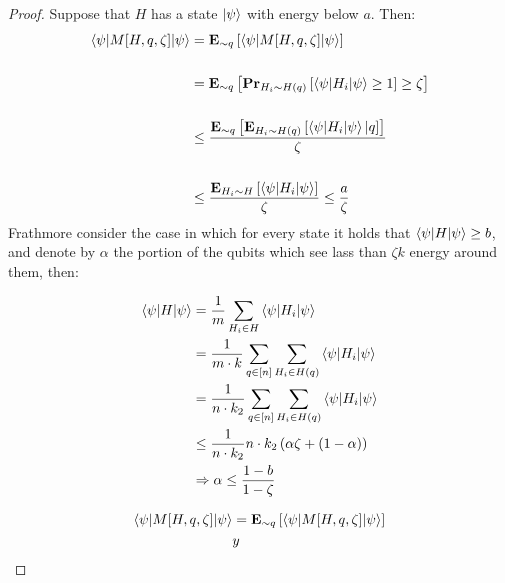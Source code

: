 \documentclass[manuscript,screen,review]{acmart}
\begin{document}
\begin{proof}
  Suppose that $H$ has a state $\ket{\psi}$ with energy below $a$. Then:  
  \begin{equation*}
    \begin{split}
      \braket{\psi|M[H,q,\zeta]|\psi} & =  \exppm{ \braket{\psi|M[H,q,\zeta]|\psi} }{\sim q} \\ 
      & \\
      & =\exppm{\prbm{ \braket{\psi|H_{i}|\psi} \ge 1 }{H_{i}\sim H(q)} \ge \zeta }{\sim q} \\
      & \\ 
      & \le  \frac{ \exppm{ \exppm{ \braket{\psi|H_{i}|\psi} | q }{ H_{i} \sim H(q)} }{ \sim q }  }{\zeta } \\
      & \\ 
      & \le  \frac{ \exppm{ \braket{\psi|H_{i}|\psi} }{ H_{i} \sim H }  }{\zeta } \le \frac{a}{\zeta}
    \end{split}
  \end{equation*}
  Frathmore consider the case in which for every state it holds that $\braket{\psi|H|\psi}\ge b$, and denote by $\alpha$ the portion of the qubits which see lass than $\zeta k$ energy around them, then: 

  \begin{equation*}
    \begin{split}
    \braket{\psi|H|\psi}  & =  \frac{1}{m}\sum_{H_{i} \in H} {\braket{\psi|H_{i}|\psi} }  \\
    & = \frac{1}{m\cdot k}\sum_{q \in [n]}\sum_{H_{i} \in H(q)} {\braket{\psi|H_{i}|\psi} }  \\
    & = \frac{1}{n \cdot k_{2}}\sum_{q \in [n]}\sum_{H_{i} \in H(q)} {\braket{\psi|H_{i}|\psi} }  \\
    & \le \frac{1}{n \cdot k_{2}} n \cdot k_{2}\left( \alpha \zeta + (1-\alpha) \right) \\
    & \Rightarrow \alpha  \le \frac{1  - b} { 1 -\zeta}
    \end{split}
  \end{equation*}

 \begin{equation*}
    \begin{split}
      \braket{\psi|M[H,q,\zeta]|\psi} & =  \exppm{ \braket{\psi|M[H,q,\zeta]|\psi} }{\sim q} \\ 
      & y
     \end{split}
  \end{equation*}
 

\end{proof}

\printbibliography
\end{document}
